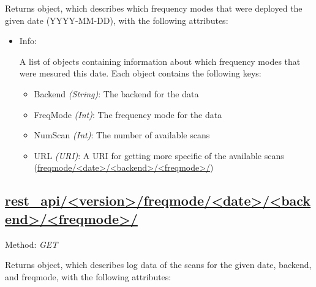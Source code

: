 Returns object, which describes which frequency modes that were deployed the
given date (YYYY-MM-DD), with the following attributes:
\begin{itemize}
    \item Info:

        A list of objects containing information about which
        frequency modes that were mesured this date. 
        Each object contains the following keys:

        \begin{itemize}
            \item Backend \emph{(String)}: The backend for the data
            \item FreqMode \emph{(Int)}: The frequency mode for the data
            \item NumScan \emph{(Int)}: The number of available scans
            \item URL \emph{(URI)}: A URI 
                for getting more specific of the available scans\\ 
                 (\url{freqmode/<date>/<backend>/<freqmode>/})
        \end{itemize}
\end{itemize}

\subsection*{\url{rest_api/<version>/freqmode/<date>/<backend>/<freqmode>/}}
Method: \emph{GET}

Returns object, which describes log data of the scans  
for the given date, backend, and freqmode,
with the following attributes:

